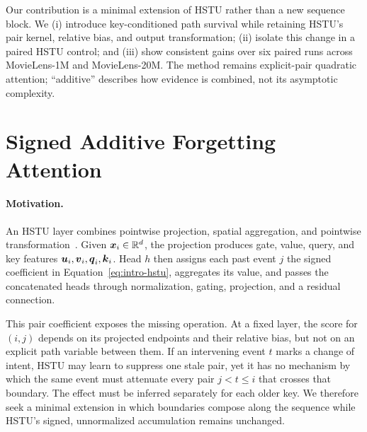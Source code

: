 \documentclass[11pt,letterpaper,logo]{yalearxiv}
\begin{document}
Our contribution is a minimal extension of HSTU rather than a new sequence
block.  We (i) introduce key-conditioned path survival while retaining HSTU's
pair kernel, relative bias, and output transformation; (ii) isolate this change
in a paired HSTU control; and (iii) show consistent gains over six paired runs
across MovieLens-1M and MovieLens-20M.  The method remains explicit-pair quadratic
attention; ``additive'' describes how evidence is combined, not its asymptotic
complexity.


\section{Signed Additive Forgetting Attention}
\label{sec:method}

\paragraph{Motivation.}
An HSTU layer combines pointwise projection, spatial aggregation, and
pointwise transformation~\citep{zhai2024actions}.  Given
$\boldsymbol{x}_i\in\mathbb{R}^d$, the projection produces gate, value, query, and key features
$\boldsymbol{u}_i,\boldsymbol{v}_i,\boldsymbol{q}_i,\boldsymbol{k}_i$.  Head $h$ then assigns each past event $j$
the signed coefficient in Equation~\eqref{eq:intro-hstu}, aggregates its value,
and passes the concatenated heads through normalization, gating, projection,
and a residual connection.

This pair coefficient exposes the missing operation.  At a fixed layer, the
score for $(i,j)$ depends on its projected endpoints and their relative bias,
but not on an explicit path variable between them.  If an intervening event
$t$ marks a change of intent, HSTU may learn to suppress one stale pair, yet it
has no mechanism by which the same event must attenuate every pair
$j<t\leq i$ that crosses that boundary.  The effect must be inferred
separately for each older key.  We therefore seek a minimal extension in which
boundaries compose along the sequence while HSTU's signed, unnormalized
accumulation remains unchanged.
\end{document}
